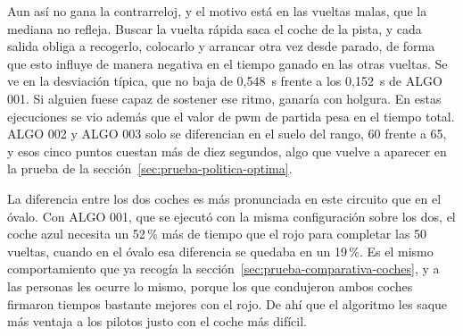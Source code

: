 Aun así no gana la contrarreloj, y el motivo está en las vueltas malas, que la mediana no refleja. Buscar la vuelta rápida saca el coche de la pista, y cada salida obliga a recogerlo, colocarlo y arrancar otra vez desde parado, de forma que esto influye de manera negativa en el tiempo ganado en las otras vueltas. Se ve en la desviación típica, que no baja de 0,548~s frente a los 0,152~s de ALGO 001. Si alguien fuese capaz de sostener ese ritmo, ganaría con holgura. En estas ejecuciones se vio además que el valor de \gls{pwm} de partida pesa en el tiempo total. ALGO 002 y ALGO 003 solo se diferencian en el suelo del rango, 60 frente a 65, y esos cinco puntos cuestan más de diez segundos, algo que vuelve a aparecer en la prueba de la sección~\ref{sec:prueba-politica-optima}.


La diferencia entre los dos coches es más pronunciada en este circuito que en el óvalo. Con ALGO 001, que se ejecutó con la misma configuración sobre los dos, el coche azul necesita un 52\,\% más de tiempo que el rojo para completar las 50 vueltas, cuando en el óvalo esa diferencia se quedaba en un 19\,\%. Es el mismo comportamiento que ya recogía la sección~\ref{sec:prueba-comparativa-coches}, y a las personas les ocurre lo mismo, porque los que condujeron ambos coches firmaron tiempos bastante mejores con el rojo. De ahí que el algoritmo les saque más ventaja a los pilotos justo con el coche más difícil.


